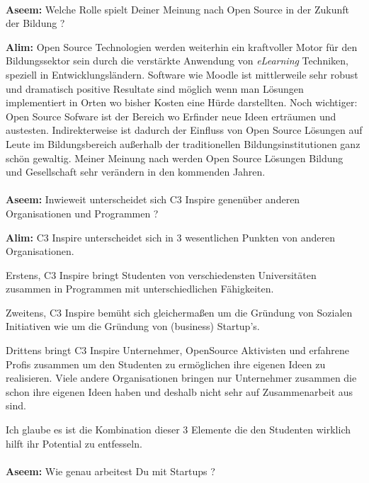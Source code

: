 \documentclass[10pt,a4paper,ngerman,twoside]{article} %
\begin{document}
\begin{multicols}{3}
\paragraph{}
\textbf{Aseem:} Welche Rolle spielt Deiner Meinung nach Open Source in der 
Zukunft der Bildung ?

\textbf{Alim:} Open Source Technologien werden weiterhin ein kraftvoller Motor 
für den Bildungssektor sein durch die verstärkte Anwendung von 
\textit{eLearning} Techniken, speziell in Entwicklungsländern. Software wie 
Moodle ist mittlerweile sehr robust und dramatisch positive Resultate 
sind möglich wenn man Lösungen implementiert in Orten wo bisher 
Kosten eine Hürde darstellten. Noch wichtiger: Open Source Sofware ist 
der Bereich wo Erfinder neue Ideen erträumen und austesten. 
Indirekterweise ist dadurch der Einfluss von Open Source Lösungen auf 
Leute im Bildungsbereich außerhalb der traditionellen 
Bildungsinstitutionen ganz schön gewaltig. Meiner Meinung nach werden 
Open Source Lösungen Bildung und Gesellschaft sehr verändern in den 
kommenden Jahren.

\paragraph{}
\textbf{Aseem:} Inwieweit unterscheidet sich C3 Inspire genenüber anderen 
Organisationen und Programmen ?

\textbf{Alim:} C3 Inspire unterscheidet sich in 3 wesentlichen Punkten von 
anderen Organisationen. 

Erstens, C3 Inspire bringt Studenten von 
verschiedensten Universitäten zusammen in Programmen mit 
unterschiedlichen Fähigkeiten. 

Zweitens, C3 Inspire bemüht sich gleichermaßen um die Gründung von 
Sozialen Initiativen wie um die Gründung von (business) Startup's. 

Drittens bringt C3 Inspire Unternehmer, OpenSource Aktivisten und 
erfahrene Profis zusammen um den Studenten zu ermöglichen ihre eigenen 
Ideen zu realisieren. Viele andere Organisationen bringen nur 
Unternehmer zusammen die schon ihre eigenen Ideen haben und deshalb 
nicht sehr auf Zusammenarbeit aus sind. 

Ich glaube es ist die Kombination dieser 3 Elemente die den Studenten 
wirklich hilft ihr Potential zu entfesseln.

\paragraph{}
\textbf{Aseem:} Wie genau arbeitest Du mit Startups ?


\end{multicols}
\end{document}

